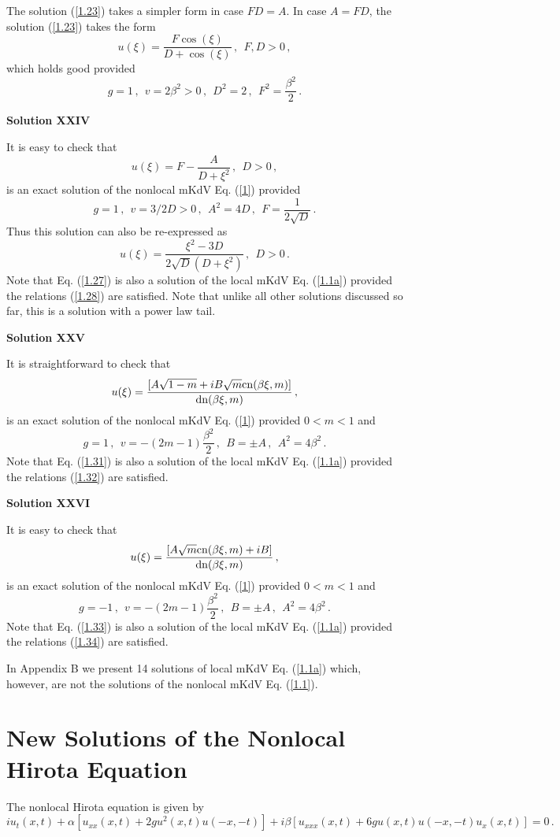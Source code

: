 \documentclass[11pt]{article}
\newcommand{\be}{\begin{equation}}
\newcommand{\ee}{\end{equation}}
\newcommand{\dn}{{\rm dn}}
\newcommand{\cn}{{\rm cn}}
\begin{document}
The solution (\ref{1.23}) takes a simpler form in case $FD = A$.
In case $A = FD$, the solution (\ref{1.23}) takes the form
\be\label{1.25}
u(\xi) = \frac{F\cos(\xi)}{D+\cos(\xi)}\,,~~F, D > 0\,,
\ee
which holds good provided
\be\label{1.26}
g = 1\,,~~v = 2\beta^2 > 0\,,~~D^2 = 2\,,~~
F^2 = \frac{\beta^2}{2}\,.
\ee

{\bf Solution XXIV}

It is easy to check that
\be\label{1.27}
u(\xi) = F -\frac{A}{D+\xi^2}\,,~~D > 0\,,
\ee
is an exact solution of the nonlocal mKdV Eq. (\ref{1}) provided 
\be\label{1.28}
g = 1\,,~~v = 3/2D > 0\,,~~A^2 = 4D\,,~~F = \frac{1}{2\sqrt{D}}\,.
\ee
Thus this solution can also be re-expressed as
\be\label{1.27a}
u(\xi) = \frac{\xi^2-3D}{2\sqrt{D}(D+\xi^2)}\,,~~D > 0\,. 
\ee
Note that Eq. (\ref{1.27}) is also a solution of the local mKdV 
Eq. (\ref{1.1a}) provided the relations (\ref{1.28}) are satisfied.
Note that unlike all other solutions discussed so far, this is a 
solution with a power law tail. 

{\bf Solution XXV}

It is straightforward to check that
\be\label{1.31}
u(\xi) = \frac{[A\sqrt{1-m}+iB\sqrt{m}\cn(\beta \xi,m)]}{\dn(\beta \xi,m)}\,,
\ee
is an exact solution of the nonlocal mKdV Eq. (\ref{1}) provided $0 < m < 1$ 
and 
\be\label{1.32}
g = 1\,,~~v = -(2m-1)\frac{\beta^2}{2}\,,~~B = \pm A\,,~~A^2 = 4\beta^2\,.
\ee
Note that Eq. (\ref{1.31}) is also a solution of the local mKdV 
Eq. (\ref{1.1a}) provided the relations (\ref{1.32}) are satisfied.

{\bf Solution XXVI}

It is easy to check that
\be\label{1.33}
u(\xi) = \frac{[A\sqrt{m}\cn(\beta \xi,m)+iB]}{\dn(\beta \xi,m)}\,,
\ee
is an exact solution of the nonlocal mKdV Eq. (\ref{1}) provided $0 < m < 1$ 
and 
\be\label{1.34}
g = -1\,,~~v = -(2m-1)\frac{\beta^2}{2}\,,~~B = \pm A\,,~~A^2 = 4\beta^2\,.
\ee
Note that Eq. (\ref{1.33}) is also a solution of the local mKdV 
Eq. (\ref{1.1a}) provided the relations (\ref{1.34}) are satisfied.

In Appendix B we present 14 solutions of local mKdV Eq. (\ref{1.1a})
which, however, are not the solutions of the nonlocal mKdV Eq. (\ref{1.1}). 

\section{New Solutions of the Nonlocal Hirota Equation}

The nonlocal Hirota equation is given by \cite{hirota}
\be\label{2.1}
iu_t(x,t)+\alpha[u_{xx}(x,t)+2g u^2(x,t) u(-x,-t)] 
+i\beta[u_{xxx}(x,t)+6g u(x,t) u(-x,-t)u_{x}(x,t)] = 0\,.
\ee
\end{document}
